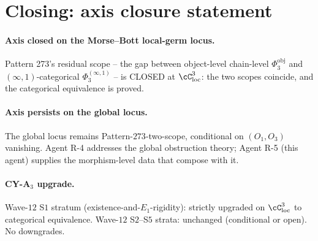 \section*{Closing: axis closure statement}

\paragraph{Axis closed on the Morse--Bott local-germ locus.}  Pattern
273's residual scope -- the gap between object-level chain-level
$\Phi_3^{\mathrm{obj}}$ and $(\infty,1)$-categorical
$\Phi_3^{(\infty,1)}$ -- is CLOSED at $\cC_{\mathrm{loc}}^3$: the
two scopes coincide, and the categorical equivalence is proved.

\paragraph{Axis persists on the global locus.}  The global locus
remains Pattern-$273$-two-scope, conditional on $(O_1, O_3)$ vanishing.
Agent R-4 addresses the global obstruction theory; Agent R-5 (this
agent) supplies the morphism-level data that compose with it.

\paragraph{CY-A$_3$ upgrade.}  Wave-$12$ S$1$ stratum
(existence-and-$E_1$-rigidity): strictly upgraded on
$\cC_{\mathrm{loc}}^3$ to categorical equivalence.  Wave-$12$
S$2$--S$5$ strata: unchanged (conditional or open).  No downgrades.


